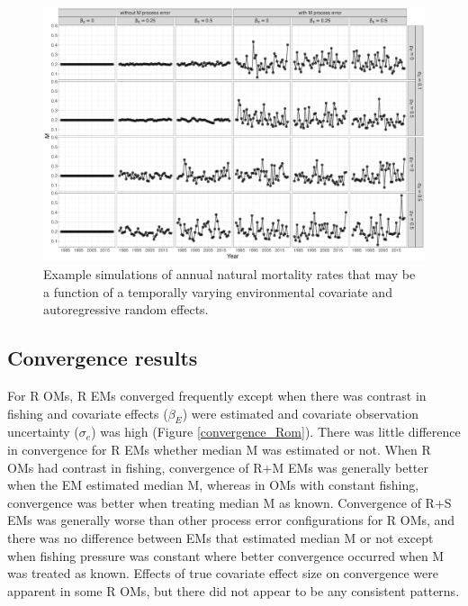 \documentclass[
  12pt,
]{article}
\begin{document}
\begin{landscape}
\begin{figure}
\caption{Example simulations of annual natural mortality rates that may be a function of a temporally varying environmental covariate and autoregressive random effects.}\label{M_example}
\begin{center}
\includegraphics[height = \textheight]{M_example}
\end{center}
\end{figure}
\end{landscape}

\hypertarget{convergence-results}{%
\subsection*{Convergence results}\label{convergence-results}}

For R OMs, R EMs converged frequently except when there was contrast in fishing and covariate effects (\(\beta_E\)) were estimated and covariate observation uncertainty (\(\sigma_e\)) was high (Figure \ref{convergence_Rom}). There was little difference in convergence for R EMs whether median M was estimated or not. When R OMs had contrast in fishing, convergence of R+M EMs was generally better when the EM estimated median M, whereas in OMs with constant fishing, convergence was better when treating median M as known. Convergence of R+S EMs was generally worse than other process error configurations for R OMs, and there was no difference between EMs that estimated median M or not except when fishing pressure was constant where better convergence occurred when M was treated as known. Effects of true covariate effect size on convergence were apparent in some R OMs, but there did not appear to be any consistent patterns.
\end{document}

